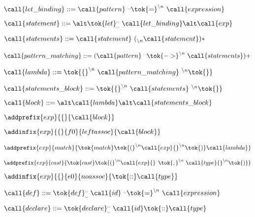  
   \item $\call{let\_binding} ::= \call{pattern}\
   {}^{\textrm{\textvisiblespace}}\tok{=}^{\backslash{}n}\ \call{expression}$
     
 
   \item $\call{statement} ::=\\
   \alt \tok{let}_{\textrm{\textvisiblespace}}^{\textrm{\textvisiblespace}}\ \call{let\_binding}\\
   \alt \call{exp}$
   \item $\call{statements} ::= \call{statement}\ ({}_{\backslash{}n}\call{statement})*$
   \item $\call{pattern\_matching} ::= (\call{pattern}\
   {}^{\textrm{\textvisiblespace}}\tok{->}^{\backslash{}n}\ \call{statements})+$

   \item $\call{lambda} ::= \tok{\{}^{\backslash{}n}\ \call{pattern\_matching}\ {}^{\backslash{}n}\tok{\}}$
   \item $\call{statements\_block} ::= \tok{\{}^{\backslash{}n}\ \call{statements}\ {}^{\backslash{}n}\tok{\}}$
   \item $\call{block} ::=\\
   \alt \call{lambda}\\
   \alt \call{statements\_block} $

   
 
   \item $\addprefix{exp}{\{}{\call{block}}$
   \item $\addinfix{exp}{\{}{f0}{leftassoc}{\call{block}}$
    
 
   \item $\addprefix{exp}{match}{\tok{match} \tok{(}^{\backslash{}n} \call{exp} {}^{\backslash{}n}\tok{)} \call{lambda}}$
   
 
   \item $\addprefix{exp}{cast}{\tok{cast}\tok{(}^{\backslash{}n} \call{exp}
   {}^{\textrm{\textvisiblespace}}\tok{,}^{\backslash{}n}\ \call{type} {}^{\backslash{}n}\tok{)}}$
   
 
   \item $\addinfix{exp}{\{}{e0}{noassoc}{\tok{::}\call{type}}$
   
 
   \item $\call{def} ::= \tok{def}_{\textrm{\textvisiblespace}}^{\textrm{\textvisiblespace}}\ \call{id}\ {}^{\textrm{\textvisiblespace}}\tok{=}^{\backslash{}n}\ \call{expression}$
    
 
   \item $\call{declare} ::= \tok{declare}_{\textrm{\textvisiblespace}}^{\textrm{\textvisiblespace}}\ \call{id}\tok{::}\call{type}$
   

